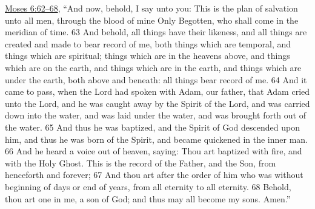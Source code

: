 \begin{compactitem}
\begin{compactitem}
					\item \hyperref[MOSES-6-62]{Moses 6:62--68}, ``And now, behold, I say unto you: This is the plan of salvation unto all men, through the blood of mine Only Begotten, who shall come in the meridian of time. 63 And behold, all things have their likeness, and all things are created and made to bear record of me, both things which are temporal, and things which are spiritual; things which are in the heavens above, and things which are on the earth, and things which are in the earth, and things which are under the earth, both above and beneath: all things bear record of me. 64 And it came to pass, when the Lord had spoken with Adam, our father, that Adam cried unto the Lord, and he was caught away by the Spirit of the Lord, and was carried down into the water, and was laid under the water, and was brought forth out of the water. 65 And thus he was baptized, and the Spirit of God descended upon him, and thus he was born of the Spirit, and became quickened in the inner man. 66 And he heard a voice out of heaven, saying: Thou art baptized with fire, and with the Holy Ghost. This is the record of the Father, and the Son, from henceforth and forever; 67 And thou art after the order of him who was without beginning of days or end of years, from all eternity to all eternity. 68 Behold, thou art one in me, a son of God; and thus may all become my sons. Amen.''

\end{compactitem}
\end{compactitem}
